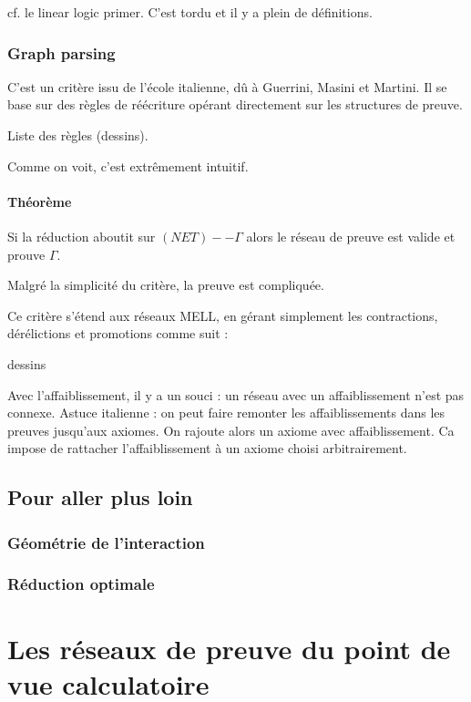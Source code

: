 \documentclass[a4paper, 11pt]{article}
\begin{document}
cf. le linear logic primer. C'est tordu et il y a plein de définitions.


\subsubsection{Graph parsing}

C'est un critère issu de l'école italienne, dû à Guerrini, Masini et Martini. Il se base sur des règles de réécriture opérant directement sur les structures de preuve.

Liste des règles (dessins).

Comme on voit, c'est extrêmement intuitif.

\paragraph{Théorème} Si la réduction aboutit sur $(NET) -- \Gamma$ alors le réseau de preuve est valide et prouve $\Gamma$.

Malgré la simplicité du critère, la preuve est compliquée.

Ce critère s'étend aux réseaux MELL, en gérant simplement les contractions, dérélictions et promotions comme suit :

dessins

Avec l'affaiblissement, il y a un souci : un réseau avec un affaiblissement n'est pas connexe. Astuce italienne : on peut faire remonter les affaiblissements dans les preuves jusqu'aux axiomes. On rajoute alors un axiome avec affaiblissement. Ca impose de rattacher l'affaiblissement à un axiome choisi arbitrairement.

\subsection{Pour aller plus loin}

\subsubsection{Géométrie de l'interaction}

\subsubsection{Réduction optimale}


\section{Les réseaux de preuve du point de vue calculatoire}
\end{document}
